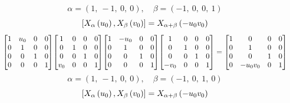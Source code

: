 \documentclass[11pt]{article}
\theoremstyle{definition}
\begin{document}
\[
\alpha = \left( 1, \  -1, \  0, \  0\right), \quad \beta = \left( -1, \  0, \  0, \  1\right)
\]
\[
\scaletoalign{\textwidth}{\left[ X_{\alpha}\left(u_{0}\right), X_{\beta}\left(v_{0}\right) \right] = X_{\alpha + \beta}\left(- u_{0} v_{0}\right)}
\]
\[
\scaletoalign{\textwidth}{{\left[\begin{matrix}1 & u_{0} & 0 & 0\\0 & 1 & 0 & 0\\0 & 0 & 1 & 0\\0 & 0 & 0 & 1\end{matrix}\right]} {\left[\begin{matrix}1 & 0 & 0 & 0\\0 & 1 & 0 & 0\\0 & 0 & 1 & 0\\v_{0} & 0 & 0 & 1\end{matrix}\right]} {\left[\begin{matrix}1 & - u_{0} & 0 & 0\\0 & 1 & 0 & 0\\0 & 0 & 1 & 0\\0 & 0 & 0 & 1\end{matrix}\right]} {\left[\begin{matrix}1 & 0 & 0 & 0\\0 & 1 & 0 & 0\\0 & 0 & 1 & 0\\- v_{0} & 0 & 0 & 1\end{matrix}\right]} = {\left[\begin{matrix}1 & 0 & 0 & 0\\0 & 1 & 0 & 0\\0 & 0 & 1 & 0\\0 & - u_{0} v_{0} & 0 & 1\end{matrix}\right]}}
\]
\[
\alpha = \left( 1, \  -1, \  0, \  0\right), \quad \beta = \left( -1, \  0, \  1, \  0\right)
\]
\[
\scaletoalign{\textwidth}{\left[ X_{\alpha}\left(u_{0}\right), X_{\beta}\left(v_{0}\right) \right] = X_{\alpha + \beta}\left(- u_{0} v_{0}\right)}
\]
\end{document}
